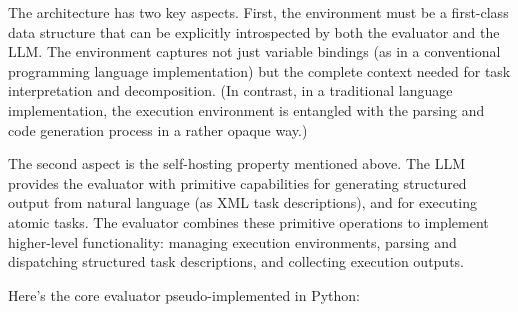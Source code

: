 \documentclass{article}
\begin{document}
The architecture has two key aspects. First, the environment must be a first-class data structure that can be explicitly introspected by both the evaluator and the LLM. The environment captures not just variable bindings (as in a conventional programming language implementation) but the complete context needed for task interpretation and decomposition. (In contrast, in a traditional language implementation, the execution environment is entangled with the parsing and code generation process in a rather opaque way.)

The second aspect is the self-hosting property mentioned above. The LLM provides the evaluator with primitive capabilities for generating structured output from natural language (as XML task descriptions), and for executing atomic tasks. The evaluator combines these primitive operations to implement higher-level functionality: managing execution environments, parsing and dispatching structured task descriptions, and collecting execution outputs. 

Here's the core evaluator pseudo-implemented in Python:
\end{document}
